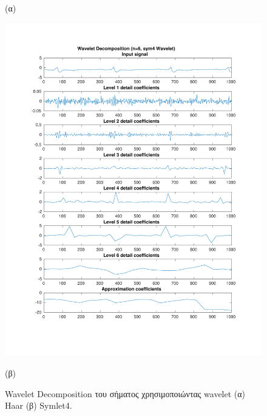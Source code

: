 \documentclass[11pt,a4paper]{article}
\begin{document}
\begin{figure}[H]
\begin{minipage}{0.48\textwidth}
	(α)
\end{minipage}
\begin{minipage}{0.48\textwidth}
	\centering
	\includegraphics[width=\textwidth]{fig/118l1_dwt2.pdf}
	
	(β)
\end{minipage}
\vfill
\caption{Wavelet Decomposition του σήματος χρησιμοποιώντας wavelet (α) Haar (β) Symlet4.}
\label{fig:118l1_dwt}
\end{figure}
\end{document}
